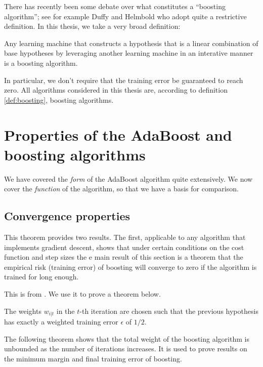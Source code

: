 There has recently been some debate over what constitutes a ``boosting
algorithm''; see for example Duffy and Helmbold \cite{Duffy99} who
adopt quite a restrictive definition.  In this thesis, we take a very
broad definition:

\begin{definition}
Any learning machine that constructs a hypothesis that is a linear
combination of base hypotheses by leveraging another learning machine
in an interative manner is a boosting algorithm.
\end{definition}

In particular, we don't require that the training error be guaranteed
to reach zero.  All algorithms considered in this thesis are,
according to definition \ref{def:boosting}, boosting algorithms.


\section{Properties of the AdaBoost and boosting algorithms}

We have covered the \emph{form} of the AdaBoost algorithm quite
extensively.  We now cover the \emph{function} of the algorithm, so
that we have a basis for comparison.

\subsection{Convergence properties}

This theorem provides two results.  The first, applicable to any
algorithm that implements gradient descent, shows that under certain
conditions on the cost function and step sizes the 
e main result of this section is a theorem that the empirical risk
(training error) of boosting will converge to zero if the algorithm is
trained for long enough.


This is from \cite{Schapire97}.  We use it to prove a theorem below.

\begin{theorem}
The weights $w_{i|t}$ in the $t$-th iteration are chosen such that the
previous hypothesis has exactly a weighted training error $\epsilon$
of $1/2$.
\end{theorem}

The following theorem shows that the total weight of the boosting
algorithm is unbounded as the number of iterations increases.  It is
used to prove results on the minimum margin and final training error
of boosting.

